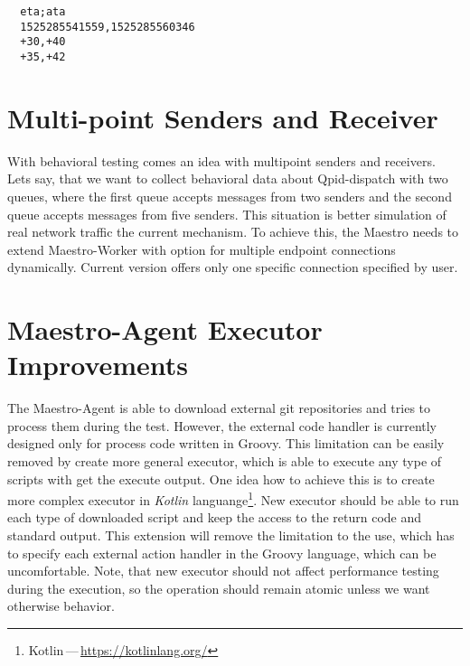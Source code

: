 \begin{verbatim}
  eta;ata
  1525285541559,1525285560346
  +30,+40
  +35,+42
\end{verbatim}

\section{Multi-point Senders and Receiver}
With behavioral testing comes an idea with multipoint senders and receivers. Lets say, that we want to collect behavioral data about Qpid-dispatch with two queues, where the first queue accepts messages from two senders and the second queue accepts messages from five senders. This situation is better simulation of real network traffic the current mechanism. To achieve this, the Maestro needs to extend Maestro-Worker with option for multiple endpoint connections dynamically. Current version offers only one specific connection specified by user.

\section{Maestro-Agent Executor Improvements}
The Maestro-Agent is able to download external git repositories and tries to process them during the test. However, the external code handler is currently designed only for process code written in Groovy. This limitation can be easily removed by create more general executor, which is able to execute any type of scripts with get the execute output. One idea how to achieve this is to create more complex executor in \emph{Kotlin} languange\footnote{Kotlin\,---\,\url{https://kotlinlang.org/}}. New executor should be able to run each type of downloaded script and keep the access to the return code and standard output. This extension will remove the limitation to the use, which has to specify each external action handler in the Groovy language, which can be uncomfortable. Note, that new executor should not affect performance testing during the execution, so the operation should remain atomic unless we want otherwise behavior.
